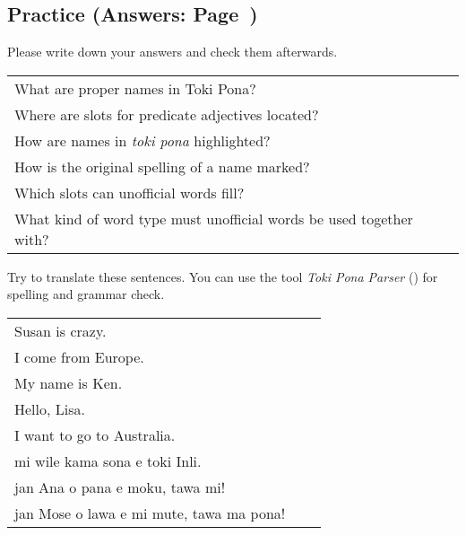 %
%
%
%
\newpage
\subsection*{Practice (Answers: Page~\pageref{'unofficial_words'})}
%
Please write down your answers and check them afterwards. 

\begin{supertabular}{p{5,5cm}|ll}
What are proper names in Toki Pona? &&  \\ %
Where are slots for predicate adjectives located? &&  \\ %
How are names in \textit{toki pona} highlighted? &&  \\ %
How is the original spelling of a name marked? &&  \\ %
Which slots can unofficial words fill? &&  \\ %
What kind of word type must unofficial words be used together with? &&  \\ %
\end{supertabular}

Try to translate these sentences. 
You can use the tool \textit{Toki Pona Parser} (\cite{www:rowa:02}) for spelling and grammar check. 

\begin{supertabular}{p{5,5cm}|ll}
Susan is crazy.  &&   \\ %
I come from Europe. &&  \\ %
My name is Ken.  &&   \\ %
Hello, Lisa.  &&   \\ %
I want to go to Australia. &&   \\ %
mi wile kama sona e toki Inli.  &&   \\ %
jan Ana o pana e moku, tawa mi!  &&   \\ %
jan Mose o lawa e mi mute, tawa ma pona!  &&   \\ %
\end{supertabular} 

%
